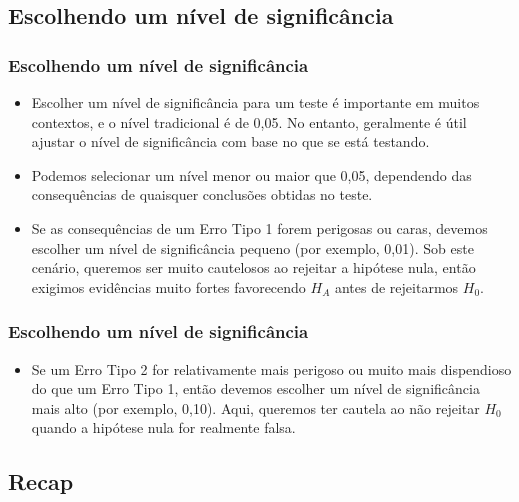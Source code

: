 
\subsection{Escolhendo um nível de significância}


\begin{frame}
\frametitle{Escolhendo um nível de significância}

\begin{itemize}
\justifying
\item Escolher um nível de significância para um teste é importante em muitos contextos, e o nível tradicional é de 0,05. No entanto, geralmente é útil ajustar o nível de significância com base no que se está testando. 
\justifying
\item Podemos selecionar um nível menor ou maior que 0,05, dependendo das consequências de quaisquer conclusões obtidas no teste.
\justifying
\item Se as consequências de um Erro Tipo 1 forem perigosas ou caras, devemos escolher um nível de significância pequeno (por exemplo, 0,01). Sob este cenário, queremos ser muito cautelosos ao rejeitar a hipótese nula, então exigimos evidências muito fortes favorecendo $H_A$ antes de rejeitarmos $H_0$.
\end{itemize}

\end{frame}


\begin{frame}
\frametitle{Escolhendo um nível de significância}

\begin{itemize}
\justifying
\item Se um Erro Tipo 2 for relativamente mais perigoso ou muito mais dispendioso do que um Erro Tipo 1, então devemos escolher um nível de significância mais alto (por exemplo, 0,10). Aqui, queremos ter cautela ao não rejeitar $H_0$ quando a hipótese nula for realmente falsa.

\end{itemize}

\end{frame}


\subsection{Recap}

